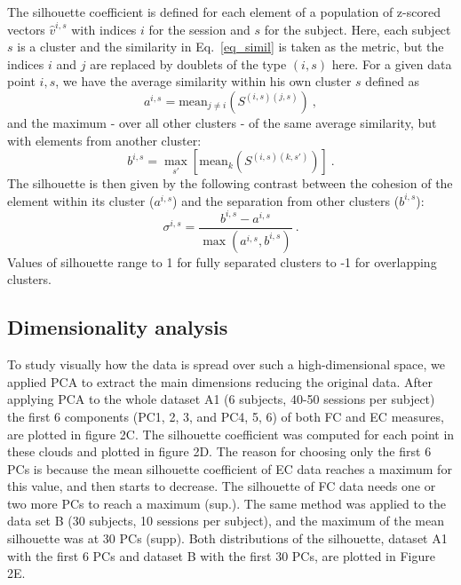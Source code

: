 \documentclass{article}
\begin{document}
The silhouette coefficient is defined for each element of a population of z-scored vectors $\hat{v}^{i,s}$ with indices $i$ for the session and $s$ for the subject.
Here, each subject $s$ is a cluster and the similarity in Eq.~\eqref{eq_simil} is taken as the metric, but the indices $i$ and $j$ are replaced by doublets of the type $(i,s)$ here.
For a given data point ${i,s}$, we have the average similarity within his own cluster $s$ defined as
\begin{equation}
a^{i,s} = \mathrm{mean}_{j \neq i}(S^{(i,s)(j,s)})
\ ,
\end{equation}
and the maximum - over all other clusters - of the same average similarity, but with elements from another cluster:
\begin{equation}
b^{i,s} =  \max_{s'}[\mathrm{mean}_{k}(S^{(i,s)(k,s')})]
\ .
\end{equation}
The silhouette is then given by the following contrast between the cohesion of the element within its cluster ($a^{i,s}$) and the separation from other clusters ($b^{i,s}$):
\begin{equation}
\sigma^{i,s} = \frac{b^{i,s} - a^{i,s}}{\max(a^{i,s},b^{i,s})}
\ .
\end{equation}
Values of silhouette range to 1 for fully separated clusters to -1 for overlapping clusters.

\subsection{Dimensionality analysis}

To study visually how the data is spread over such a high-dimensional space, we applied PCA to extract the main dimensions reducing the original data. After applying PCA to the whole dataset A1 (6 subjects, 40-50 sessions per subject) the first 6 components (PC1, 2, 3, and PC4, 5, 6) of both FC and EC measures, are plotted in figure 2C. The silhouette coefficient was computed for each point in these clouds and plotted in figure 2D. The reason for choosing only the first 6 PCs is because the mean silhouette coefficient of EC data reaches a maximum for this value, and then starts to decrease. The silhouette of FC data needs one or two more PCs to reach a maximum (sup.). The same method was applied to the data set B (30 subjects, 10 sessions per subject), and the maximum of the mean silhouette was at 30 PCs (supp). Both distributions of the silhouette, dataset A1 with the first 6 PCs and dataset B with the first 30 PCs, are plotted in Figure 2E.
\end{document}
